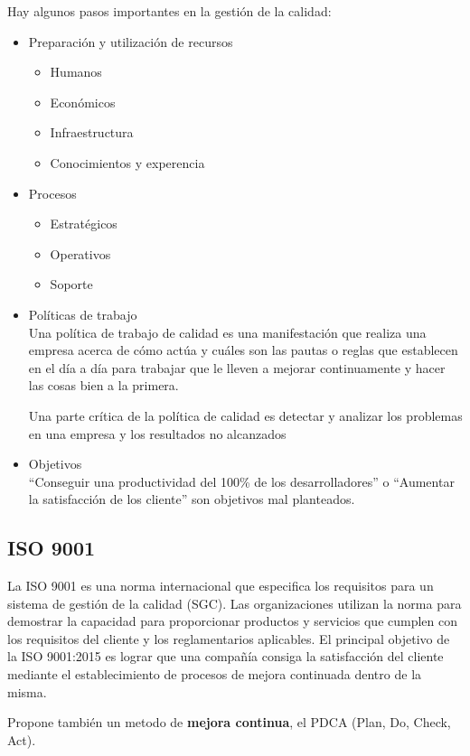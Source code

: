 Hay algunos pasos importantes en la gestión de la calidad:
\begin{itemize}
   \item Preparación y utilización de recursos
   \begin{itemize}
      \item Humanos
      \item Económicos
      \item Infraestructura
      \item Conocimientos y experencia
   \end{itemize}
   \item Procesos
   \begin{itemize}
      \item Estratégicos
      \item Operativos
      \item Soporte
   \end{itemize}
   \item Políticas de trabajo\\
   Una política de trabajo de calidad es una manifestación que realiza una empresa acerca de cómo actúa y cuáles son las pautas o reglas que establecen en el día a día para trabajar que le lleven a mejorar continuamente y hacer las cosas bien a la primera.

   Una parte crítica de la política de calidad es detectar y analizar los problemas en una empresa y los resultados no alcanzados
   \item Objetivos\\
   ``Conseguir una productividad del 100\% de los desarrolladores'' o ``Aumentar la satisfacción de los cliente'' son objetivos mal planteados.

\end{itemize}

\subsection{ISO 9001}
La ISO 9001 es una norma internacional que especifica los requisitos para un sistema de gestión de la calidad (SGC). Las organizaciones utilizan la norma para demostrar la capacidad para proporcionar productos y servicios que cumplen con los requisitos del cliente y los reglamentarios aplicables.
El principal objetivo de la ISO 9001:2015 es lograr que una compañía consiga la satisfacción del cliente mediante el establecimiento de procesos de mejora continuada dentro de la misma.

Propone también un metodo de \textbf{mejora continua}, el PDCA (Plan, Do, Check, Act).

